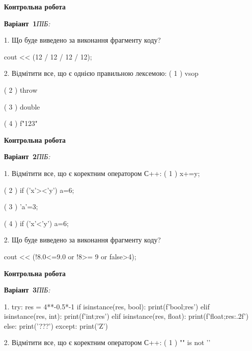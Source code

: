 \documentclass[11pt]{article}
\begin{document}
{\large\textbf{Контрольна робота}}

\textbf{Варіант \No\,1}\hfill \textit{ПІБ:}\,\underline{\hspace{60mm}}
\vspace{4mm}

1. Що буде виведено за виконання фрагменту коду?

cout << (12 / 12 / 12 / 12);

2. %
Відмітити все, що є однією правильною лексемою:
( 1 ) vsop

( 2 ) throw

( 3 ) double

( 4 ) f"123"



\newpage

\newpage

{\large\textbf{Контрольна робота}}

\textbf{Варіант \No\,2}\hfill \textit{ПІБ:}\,\underline{\hspace{60mm}}
\vspace{4mm}

1. %
Відмітити все, що є коректним оператором С++:
( 1 ) x+=y;

( 2 ) if ('x'><'y') a=6;

( 3 ) 'a'=3;

( 4 ) if ('x'<'y') a=6;

2. Що буде виведено за виконання фрагменту коду?

cout << (!8.0<=9.0 or !8>= 9 or false>4);



\newpage

\newpage

{\large\textbf{Контрольна робота}}

\textbf{Варіант \No\,3}\hfill \textit{ПІБ:}\,\underline{\hspace{60mm}}
\vspace{4mm}

1. 
try:
    res = 4**-0.5*-1
    if isinstance(res, bool):
        print(f'bool;{res}')
    elif isinstance(res, int):
        print(f'int;{res}')
    elif isinstance(res, float):
        print(f'float;{res:.2f}')
    else:
        print('???')
except:
    print('Z')

2. %
Відмітити все, що є коректним оператором С++:
( 1 ) "\n" is not '\n'
\end{document}
